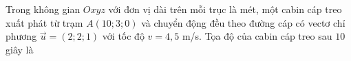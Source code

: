 \begin{ex}
Trong không gian $Oxyz$ với đơn vị dài trên mỗi trục là mét, một cabin cáp treo xuất phát từ trạm $A(10;3;0)$ và chuyển động đều theo đường cáp có vectơ chỉ phương $\vec u=(2;2;1)$ với tốc độ $v=4{,}5$ m/s. Tọa độ của cabin cáp treo sau $10$ giây là
\end{ex}
